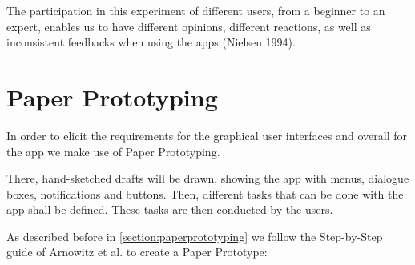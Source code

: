 The participation in this experiment of different users,
from a beginner to an expert, enables us to have different
opinions, different reactions, as well as inconsistent
feedbacks when using the apps (Nielsen 1994). \cite{moumane2016usability}





\section{Paper Prototyping}
In order to elicit the requirements for the graphical user interfaces and overall for the app we make use of Paper Prototyping. 

There, hand-sketched drafts will be drawn, showing the app with menus, dialogue boxes, notifications and buttons. Then, different tasks that can be done with the app shall be defined. These tasks are then conducted by the users.

As described before in \ref{section:paperprototyping} we follow the Step-by-Step guide of Arnowitz et al. \cite{arnowitz2010effective} to create a Paper Prototype:


